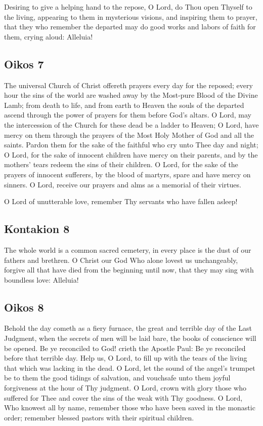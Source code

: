 Desiring to give a helping hand to the repose, O Lord, do Thou open Thyself to the living, appearing to them in mysterious visions, and inspiring them to prayer, that they who remember the departed may do good works and labors of faith for them, crying aloud: Alleluia!

\subsection{Oikos 7}

The universal Church of Christ offereth prayers every day for the reposed; every hour the sins of the world are washed away by the Most-pure Blood of the Divine Lamb; from death to life, and from earth to Heaven the souls of the departed ascend through the power of prayers for them before God's altars. O Lord, may the intercession of the Church for these dead be a ladder to Heaven; O Lord, have mercy on them through the prayers of the Most Holy Mother of God and all the saints. Pardon them for the sake of the faithful who cry unto Thee day and night; O Lord, for the sake of innocent children have mercy on their parents, and by the mothers' tears redeem the sins of their children. O Lord, for the sake of the prayers of innocent sufferers, by the blood of martyrs, spare and have mercy on sinners. O Lord, receive our prayers and alms as a memorial of their virtues.

O Lord of unutterable love, remember Thy servants who have fallen asleep!

\subsection{Kontakion 8}

The whole world is a common sacred cemetery, in every place is the dust of our fathers and brethren. O Christ our God Who alone lovest us unchangeably, forgive all that have died from the beginning until now, that they may sing with boundless love: Alleluia!

\subsection{Oikos 8}

Behold the day cometh as a fiery furnace, the great and terrible day of the Last Judgment, when the secrets of men will be laid bare, the books of conscience will be opened. Be ye reconciled to God! crieth the Apostle Paul: Be ye reconciled before that terrible day. Help us, O Lord, to fill up with the tears of the living that which was lacking in the dead. O Lord, let the sound of the angel's trumpet be to them the good tidings of salvation, and vouchsafe unto them joyful forgiveness at the hour of Thy judgment. O Lord, crown with glory those who suffered for Thee and cover the sins of the weak with Thy goodness. O Lord, Who knowest all by name, remember those who have been saved in the monastic order; remember blessed pastors with their spiritual children.

